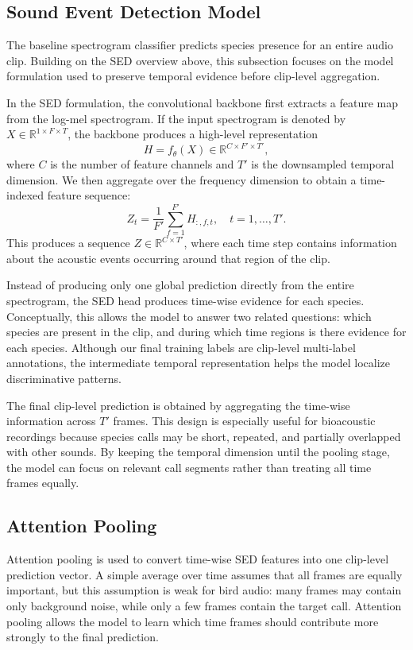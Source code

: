 \documentclass[a4paper,12pt]{article}
\begin{document}
\subsection{Sound Event Detection Model}

The baseline spectrogram classifier predicts species presence for an entire audio clip. Building on the SED overview above, this subsection focuses on the model formulation used to preserve temporal evidence before clip-level aggregation.

In the SED formulation, the convolutional backbone first extracts a feature map from the log-mel spectrogram. If the input spectrogram is denoted by $X \in \mathbb{R}^{1 \times F \times T}$, the backbone produces a high-level representation
\[
H = f_{\theta}(X) \in \mathbb{R}^{C \times F' \times T'},
\]
where $C$ is the number of feature channels and $T'$ is the downsampled temporal dimension. We then aggregate over the frequency dimension to obtain a time-indexed feature sequence:
\[
Z_t = \frac{1}{F'} \sum_{f=1}^{F'} H_{:, f, t}, \quad t = 1, \ldots, T'.
\]
This produces a sequence $Z \in \mathbb{R}^{C \times T'}$, where each time step contains information about the acoustic events occurring around that region of the clip.

Instead of producing only one global prediction directly from the entire spectrogram, the SED head produces time-wise evidence for each species. Conceptually, this allows the model to answer two related questions: which species are present in the clip, and during which time regions is there evidence for each species. Although our final training labels are clip-level multi-label annotations, the intermediate temporal representation helps the model localize discriminative patterns.

The final clip-level prediction is obtained by aggregating the time-wise information across $T'$ frames. This design is especially useful for bioacoustic recordings because species calls may be short, repeated, and partially overlapped with other sounds. By keeping the temporal dimension until the pooling stage, the model can focus on relevant call segments rather than treating all time frames equally.

\subsection{Attention Pooling}

Attention pooling is used to convert time-wise SED features into one clip-level prediction vector. A simple average over time assumes that all frames are equally important, but this assumption is weak for bird audio: many frames may contain only background noise, while only a few frames contain the target call. Attention pooling allows the model to learn which time frames should contribute more strongly to the final prediction.
\end{document}
